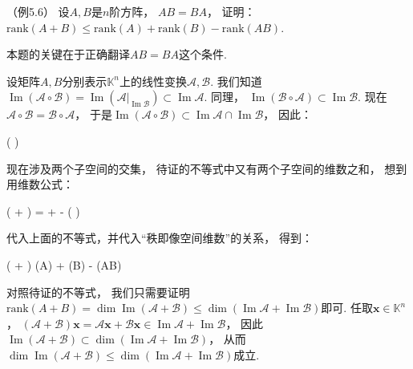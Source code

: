 \begin{example}（例5.6）
    设$A,B$是$n$阶方阵，
    $AB=BA$，
    证明：$\mathrm{rank}(A+B) \leq \mathrm{rank} (A) + \mathrm{rank}(B) - \mathrm{rank}(AB)$.
\end{example}
\smallskip
\begin{remark}
    本题的关键在于正确翻译$AB=BA$这个条件.
\end{remark}
\smallskip
\begin{pf}
    设矩阵$A,B$分别表示$\mathbb{K}^n$上的线性变换$\mathcal{A} , \mathcal{B}$.
    我们知道$\operatorname{Im}(\mathcal{A} \circ \mathcal{B}) = \operatorname{Im}(\mathcal{A}|_{\operatorname{Im}\mathcal{B}}) \subset \operatorname{Im}\mathcal{A}$.
    同理，
    $\operatorname{Im}(\mathcal{B} \circ \mathcal{A}) \subset \operatorname{Im}\mathcal{B}$.
    现在$\mathcal{A} \circ \mathcal{B} = \mathcal{B} \circ \mathcal{A}$，
    于是$ \operatorname{Im}(\mathcal{A} \circ \mathcal{B}) \subset \operatorname{Im}\mathcal{A} \cap \operatorname{Im}\mathcal{B}$，
    因此：
    \begin{eq1}
    \dim {}( \circ {}) \leq \dim {} \cap {}
    \end{eq1}

    现在涉及两个子空间的交集，
    待证的不等式中又有两个子空间的维数之和，
    想到用维数公式：
    \begin{eq1}
    \dim ( + )
    = \dim {}  
    + \dim {} 
    - \dim (  \cap {}   )
    \end{eq1}

    代入上面的不等式，并代入“秩即像空间维数”的关系，
    得到：
    \begin{eq1}
     \dim ( + )
     \leq {}(A) + (B) - (AB) 
    \end{eq1}

    对照待证的不等式，
    我们只需要证明$\mathrm{rank}(A+B) = \dim \operatorname{Im}(\mathcal{A}+ \mathcal{B}) \leq \dim (\operatorname{Im}\mathcal{A} + \operatorname{Im}\mathcal{B})$即可.
    任取$\bm{x} \in \mathbb{K}^n$，
    $(\mathcal{A}+\mathcal{B})\bm{x} = \mathcal{A}\bm{x} + \mathcal{B}\bm{x} \in \operatorname{Im}\mathcal{A} + \operatorname{Im}\mathcal{B}$，
    因此$\operatorname{Im}(\mathcal{A}+\mathcal{B}) \subset \dim (\operatorname{Im}\mathcal{A} + \operatorname{Im}\mathcal{B})$，
    从而$\dim \operatorname{Im}(\mathcal{A}+ \mathcal{B}) \leq \dim (\operatorname{Im}\mathcal{A} + \operatorname{Im}\mathcal{B})$成立.
\end{pf}

